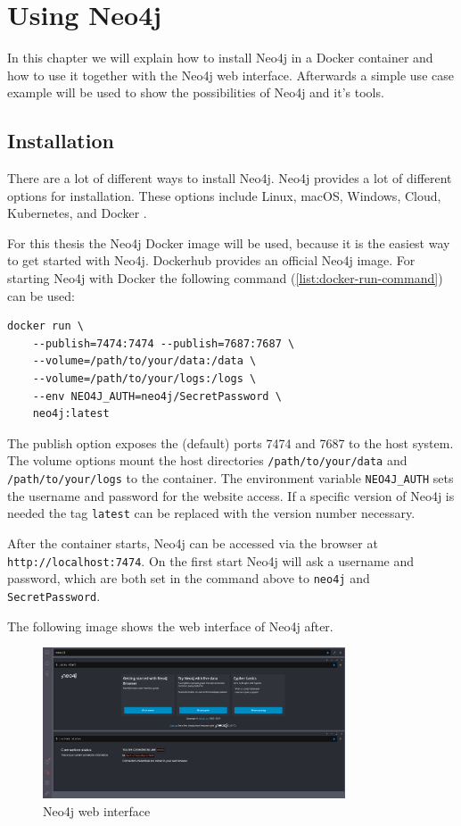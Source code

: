 \section{Using Neo4j}
In this chapter we will explain how to install Neo4j in a Docker container and
how to use it together with the Neo4j web interface. Afterwards a simple use case
example will be used to show the possibilities of Neo4j and it's tools.

\subsection{Installation}
There are a lot of different ways to install Neo4j. Neo4j provides a lot of
different options for installation. These options include Linux, macOS, Windows, Cloud,
Kubernetes, and Docker \parencite{neo4j:installation}.

For this thesis the Neo4j Docker image will be used, because it is the easiest
way to get started with Neo4j. Dockerhub provides an official Neo4j image. For
starting Neo4j with Docker the following command (\autoref{list:docker-run-command}) can be used:
\begin{lstlisting}[caption=Neo4j docker run command,label=list:docker-run-command,basicstyle=\ttfamily]
docker run \
    --publish=7474:7474 --publish=7687:7687 \
    --volume=/path/to/your/data:/data \
    --volume=/path/to/your/logs:/logs \ 
    --env NEO4J_AUTH=neo4j/SecretPassword \
    neo4j:latest
\end{lstlisting}
The publish option exposes the (default) ports 7474 and 7687 to the host system.
The volume options mount the host directories \texttt{/path/to/your/data} and
\texttt{/path/to/your/logs} to the container. The environment variable
\texttt{NEO4J\_AUTH} sets the username and password for the website access. If a
specific version of Neo4j is needed the tag \texttt{latest} can be replaced with
the version number necessary.

After the container starts, Neo4j can be accessed via the browser at \\
\texttt{http://localhost:7474}. On the first start Neo4j will ask a username and
password, which are both set in the command above to \texttt{neo4j} and
\texttt{SecretPassword}.

The following image shows the web interface of Neo4j after.
\begin{figure}[ht]
    \centering
    \includegraphics[width=0.8\textwidth]{images/neo4j-web-interface.png}
    \caption{Neo4j web interface}
    \label{fig:neo4j-web-interface}
\end{figure}

